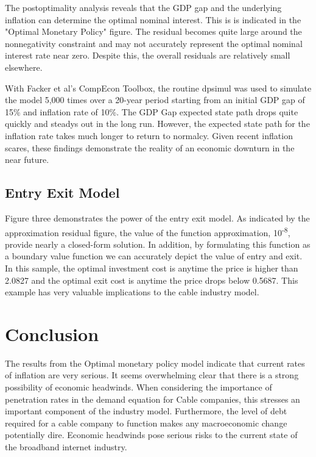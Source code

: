 \documentclass[a4paper,oneside]{article}
\begin{document}
The postoptimality analysis reveals that the GDP gap and the underlying inflation can determine the optimal nominal interest. 
This is is indicated in the "Optimal Monetary Policy" figure. 
The residual becomes quite large around the nonnegativity constraint and may not accurately represent the optimal nominal interest rate near zero.
Despite this, the overall residuals are relatively small elsewhere.

With Facker et al's CompEcon Toolbox, the routine dpsimul was used to simulate the model 5,000 times over a 20-year period starting from an initial GDP gap of 15\% and inflation rate of 10\%.
The GDP Gap expected state path drops quite quickly and steadys out in the long run. 
However, the expected state path for the inflation rate takes much longer to return to normalcy.
Given recent inflation scares, these findings demonstrate the reality of an economic downturn in the near future.

\subsection{Entry Exit Model}
Figure three demonstrates the power of the entry exit model. 
As indicated by the approximation residual figure, the value of the function approximation, 10\textsuperscript{-8}, provide nearly a closed-form solution. 
In addition, by formulating this function as a boundary value function we can accurately depict the value of entry and exit. 
In this sample, the optimal investment cost is anytime the price is higher than 2.0827 and the optimal exit cost is anytime the price drops below 0.5687.
This example has very valuable implications to the cable industry model.

\section{Conclusion}
The results from the Optimal monetary policy model indicate that current rates of inflation are very serious. 
It seems overwhelming clear that there is a strong possibility of economic headwinds.
When considering the importance of penetration rates in the demand equation for Cable companies, this stresses an important component of the industry model.
Furthermore, the level of debt required for a cable company to function makes any macroeconomic change potentially dire. 
Economic headwinds pose serious risks to the current state of the broadband internet industry.
\end{document}

